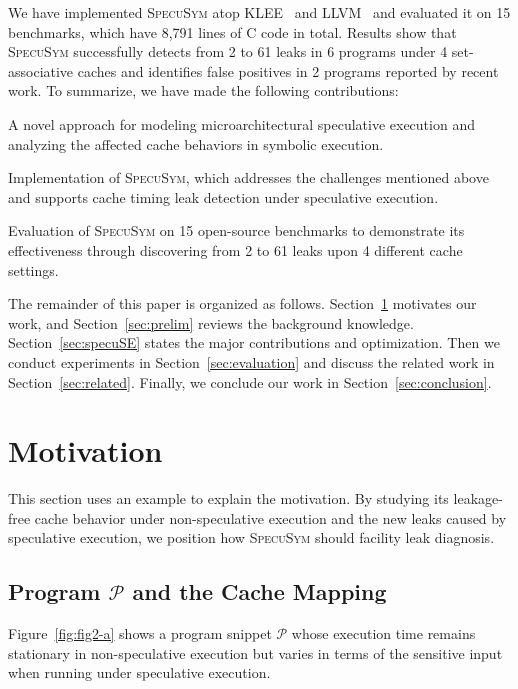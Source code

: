 \documentclass[sigconf]{acmart}
\newcommand{\SpecuSym}{\textsc{SpecuSym} }
\newcommand{\prog}{\mathcal{P}}
\begin{document}
We have implemented \SpecuSym atop KLEE~\cite{CadarDE08} and LLVM~\cite{LattnerA04} 
and evaluated it on 15 benchmarks, which have 8,791 lines of C code in total. Results 
show that \SpecuSym successfully detects from 2 to 61 leaks in 6 programs under 4 
set-associative caches and identifies false positives in 2 programs reported by recent 
work. To summarize, we have made the following contributions:

\begin{compactitem}
  \item 
    A novel approach for modeling microarchitectural speculative execution and 
		analyzing the affected cache behaviors in symbolic execution.
  \item 
		Implementation of \textsc{SpecuSym}, which addresses the challenges mentioned
		above and supports cache timing leak detection under speculative execution. 
  \item 
    Evaluation of \SpecuSym on 15 open-source benchmarks to demonstrate its 
    effectiveness through discovering from 2 to 61 leaks upon 4 different 
		cache settings.
\end{compactitem}




The remainder of this paper is organized as follows. Section~\ref{sec:mtv} 
motivates our work, and Section~\ref{sec:prelim} reviews the background 
knowledge. Section~\ref{sec:specuSE} states the major contributions and
optimization. Then we conduct experiments in Section~\ref{sec:evaluation} 
and discuss the related work in Section~\ref{sec:related}. Finally, we 
conclude our work in Section~\ref{sec:conclusion}.




\section{Motivation}
\label{sec:mtv}

This section uses an example to explain the motivation. By studying its 
leakage-free cache behavior under non-speculative execution and the new 
leaks caused by speculative execution, we position how \SpecuSym should
facility leak diagnosis.


\subsection{Program ${\prog}$ and the Cache Mapping}
\label{sec:leak_example}

Figure~\ref{fig:fig2-a} shows a program snippet ${\prog}$ whose execution 
time remains stationary in non-speculative execution but varies in terms
of the sensitive input when running under speculative execution.
\end{document}
